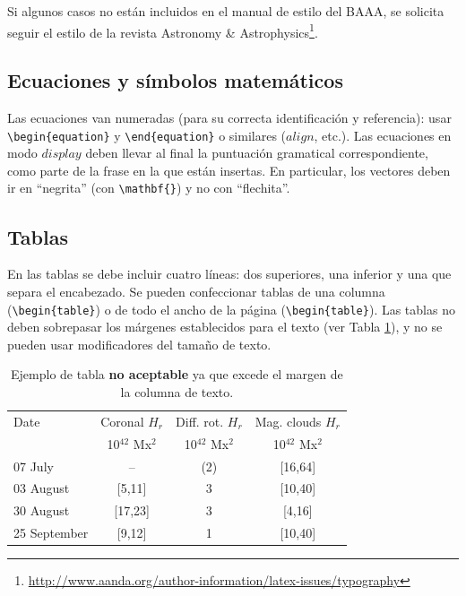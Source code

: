 \documentclass[baaa]{baaa}
\begin{document}
Si algunos casos no están incluidos en el manual de estilo del BAAA, se solicita seguir el estilo de la revista Astronomy \& Astrophysics\footnote{\url{http://www.aanda.org/author-information/latex-issues/typography}}.

\subsection{Ecuaciones y símbolos matemáticos}

Las ecuaciones van numeradas (para su correcta identificación y referencia): usar \verb|\begin{equation}| y \verb|\end{equation}| o similares ($align$, etc.). Las ecuaciones en modo $display$ deben llevar al final la puntuación gramatical correspondiente, como parte de la frase en la que están insertas. En particular, los vectores deben ir en ``negrita'' (con \verb+\mathbf{}+) y no con ``flechita''.

\subsection{Tablas}

En las tablas se debe incluir cuatro líneas: dos superiores, una inferior y una que separa el encabezado. Se pueden confeccionar tablas de una columna (\verb|\begin{table}|) o de todo el ancho de la página (\verb|\begin{table}|). Las tablas no deben sobrepasar los márgenes establecidos para el texto (ver Tabla \ref{tabla1}), y no se pueden usar modificadores del tamaño de texto.

\begin{table}[!t]
\centering
\caption{Ejemplo de tabla {\bf no aceptable} ya que excede el margen de la columna de texto.}
\begin{tabular}{lccc}
\hline\hline\noalign{\smallskip}
Date & Coronal $H_r$ & Diff. rot. $H_r$& Mag. clouds $H_r$\\
& 10$^{42}$ Mx$^{2}$& 10$^{42}$ Mx$^{2}$ & 10$^{42}$ Mx$^{2}$ \\
\hline\noalign{\smallskip}
07 July  &  -- & (2) & [16,64]\\
03 August& [5,11]& 3 & [10,40]\\
30 August & [17,23] & 3& [4,16]\\
25 September & [9,12] & 1 & [10,40]\\
\hline
\end{tabular}
\label{tabla1}
\end{table}
 
\end{document}
